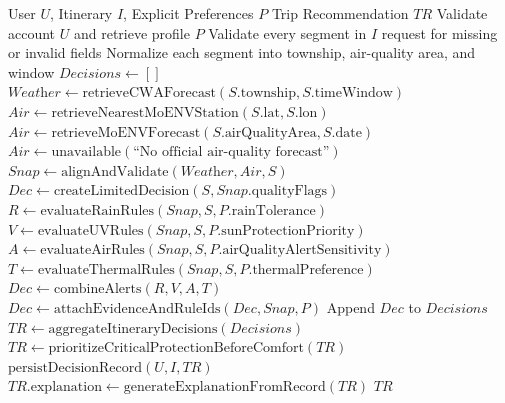 \documentclass[conference]{IEEEtran}
\begin{document}
\begin{algorithm}[t]
  \caption{Personalized Weather Anchor Agent}
  \label{alg:pwa_agent}
  \begin{algorithmic}[1]
    \Require User $U$, Itinerary $I$, Explicit Preferences $P$
    \Ensure Trip Recommendation $TR$
    \State Validate account $U$ and retrieve profile $P$
    \State Validate every segment in $I$
      \State \Return request for missing or invalid fields
    \EndIf
    \State Normalize each segment into township, air-quality area, and window
    \State $\textit{Decisions} \gets []$
      \State $\textit{Weather} \gets \text{retrieveCWAForecast}(S.\text{township}, S.\text{timeWindow})$
        \State $\textit{Air} \gets \text{retrieveNearestMoENVStation}(S.\text{lat}, S.\text{lon})$
        \State $\textit{Air} \gets \text{retrieveMoENVForecast}(S.\text{airQualityArea}, S.\text{date})$
      \Else
        \State $\textit{Air} \gets \text{unavailable}(\text{``No official air-quality forecast''})$
      \EndIf
      \State $\textit{Snap} \gets \text{alignAndValidate}(\textit{Weather}, \textit{Air}, S)$
        \State $\textit{Dec} \gets \text{createLimitedDecision}(S, \textit{Snap}.\text{qualityFlags})$
      \Else
        \State $R \gets \text{evaluateRainRules}(\textit{Snap}, S, P.\text{rainTolerance})$
        \State $V \gets \text{evaluateUVRules}(\textit{Snap}, S, P.\text{sunProtectionPriority})$
        \State $A \gets \text{evaluateAirRules}(\textit{Snap}, S, P.\text{airQualityAlertSensitivity})$
        \State $T \gets \text{evaluateThermalRules}(\textit{Snap}, S, P.\text{thermalPreference})$
        \State $\textit{Dec} \gets \text{combineAlerts}(R, V, A, T)$
        \State $\textit{Dec} \gets \text{attachEvidenceAndRuleIds}(\textit{Dec}, \textit{Snap}, P)$
      \EndIf
      \State Append $\textit{Dec}$ to $\textit{Decisions}$
    \EndFor
    \State $TR \gets \text{aggregateItineraryDecisions}(\textit{Decisions})$
    \State $TR \gets \text{prioritizeCriticalProtectionBeforeComfort}(TR)$
    \State $\text{persistDecisionRecord}(U, I, TR)$
    \State $TR.\text{explanation} \gets \text{generateExplanationFromRecord}(TR)$
    \State \Return $TR$
  \end{algorithmic}
\end{algorithm}
\end{document}
